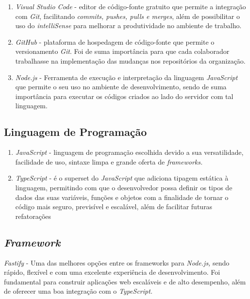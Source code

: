 \begin{enumerate}
	\item\textit{ Visual Studio Code} - editor de código-fonte gratuito que permite a integração com \textit{Git}, facilitando \textit{commits, pushes, pulls e merges}, além de possibilitar o uso do \textit{intelliSense} para melhorar a produtividade no ambiente de trabalho.
	
	\item \textit{GitHub} -  plataforma de hospedagem de código-fonte que permite o versionamento \textit{ Git}. Foi de suma importância para que cada colaborador trabalhasse na implementação das mudanças nos repositórios da organização.
	
	\item \textit{Node.js} -  Ferramenta de execução e interpretação da linguagem \textit{JavaScript} que permite o seu uso no ambiente de desenvolvimento, sendo de suma importância para executar os códigos criados ao lado do servidor com tal linguagem. 
\end{enumerate}


\subsection{Linguagem de Programação}

\begin{enumerate}
	\item \textit{JavaScript} -   linguagem de programação escolhida devido a sua  versatilidade, facilidade de uso, sintaxe limpa e grande oferta de \textit{frameworks.}
	\item \textit{TypeScript} - é o superset do \textit{JavaScript} que adiciona tipagem estática à linguagem,  permitindo com que o desenvolvedor possa definir os tipos de dados das suas variáveis, funções e objetos com a finalidade de tornar o código mais seguro, previsível e escalável, além de facilitar futuras refatorações

\end{enumerate}

\subsection{\textit{Framework}}
\textit{Fastify} - Uma das melhores opções entre os frameworks para \textit{Node.js,} sendo rápido, flexível e com uma excelente experiência de desenvolvimento. Foi fundamental para construir aplicações web escaláveis e de alto desempenho, além de oferecer uma boa integração com o \textit{TypeScript.}

